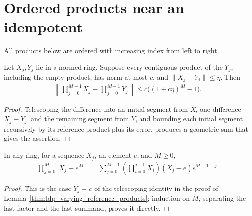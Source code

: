 \section{Ordered products near an idempotent}
\label{sec:perturbations_products}

All products below are ordered with increasing index from left to right.

\begin{lemma}
    \label{thm:ldp_varying_reference_products}
    \leanok
    Let $X_j,Y_j$ lie in a normed ring. Suppose every contiguous product of
    the $Y_j$, including the empty product, has norm at most $c$, and
    $\|X_j-Y_j\|\le\eta$. Then
    \begin{align}
        \left\|\prod_{j=0}^{M-1}X_j-\prod_{j=0}^{M-1}Y_j\right\|
        \le c\bigl((1+c\eta)^M-1\bigr).
    \end{align}
\end{lemma}
\begin{proof}\leanok
    Telescoping the difference into an initial segment from $X$, one
    difference $X_j-Y_j$, and the remaining segment from $Y$, and bounding each
    initial segment recursively by its reference product plus its error,
    produces a geometric sum that gives the assertion.
\end{proof}

\begin{lemma}
    \label{thm:ldp_ordered_telescoping_identity}
    \leanok
    In any ring, for a sequence $X_j$, an element $e$, and $M\ge0$,
    \begin{align}
        \prod_{j=0}^{M-1}X_j-e^M
         & =\sum_{j=0}^{M-1}
        \left(\prod_{i=0}^{j-1}X_i\right)(X_j-e)e^{M-1-j}.
        \label{eq:ldp_ordered_telescoping_identity}
    \end{align}
\end{lemma}
\begin{proof}\leanok
    This is the case $Y_j=e$ of the telescoping identity in the proof of
    Lemma~\ref{thm:ldp_varying_reference_products}; induction on $M$,
    separating the last factor and the last summand, proves it directly.
\end{proof}

